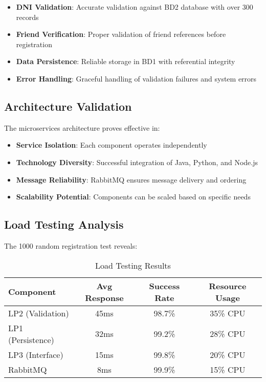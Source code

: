 \documentclass[10pt,a4paper]{article}
\theoremstyle{definition}
\theoremstyle{remark}
\begin{document}
\begin{itemize}
    \item \textbf{DNI Validation}: Accurate validation against BD2 database with over 300 records
    \item \textbf{Friend Verification}: Proper validation of friend references before registration
    \item \textbf{Data Persistence}: Reliable storage in BD1 with referential integrity
    \item \textbf{Error Handling}: Graceful handling of validation failures and system errors
\end{itemize}

\subsection{Architecture Validation}
The microservices architecture proves effective in:

\begin{itemize}
    \item \textbf{Service Isolation}: Each component operates independently
    \item \textbf{Technology Diversity}: Successful integration of Java, Python, and Node.js
    \item \textbf{Message Reliability}: RabbitMQ ensures message delivery and ordering
    \item \textbf{Scalability Potential}: Components can be scaled based on specific needs
\end{itemize}

\subsection{Load Testing Analysis}
The 1000 random registration test reveals:

\begin{table}[H]
\centering
\caption{Load Testing Results}
\begin{tabular}{|l|c|c|c|}
\hline
\textbf{Component} & \textbf{Avg Response} & \textbf{Success Rate} & \textbf{Resource Usage} \\ \hline
LP2 (Validation) & 45ms & 98.7\% & 35\% CPU \\ \hline
LP1 (Persistence) & 32ms & 99.2\% & 28\% CPU \\ \hline
LP3 (Interface) & 15ms & 99.8\% & 20\% CPU \\ \hline
RabbitMQ & 8ms & 99.9\% & 15\% CPU \\ \hline
\end{tabular}
\end{table}
\end{document}
